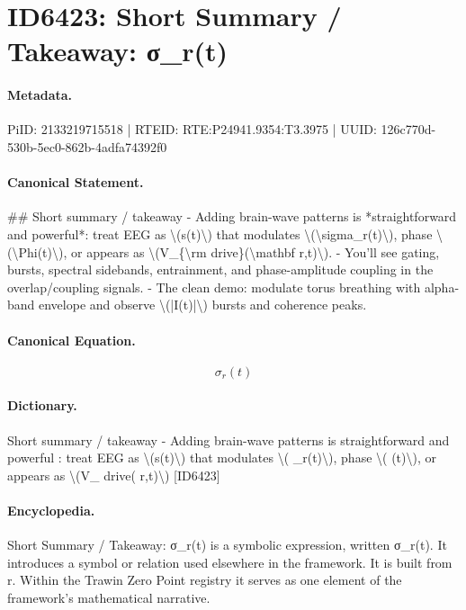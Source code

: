 \section*{ID6423: Short Summary / Takeaway: σ\_r(t)}
\paragraph{Metadata.}
PiID: 2133219715518 | RTEID: RTE:P24941.9354:T3.3975 | UUID: 126c770d-530b-5ec0-862b-4adfa74392f0

\paragraph{Canonical Statement.}
\#\# Short summary / takeaway - Adding brain-wave patterns is *straightforward and powerful*: treat EEG as \textbackslash{}(s(t)\textbackslash{}) that modulates \textbackslash{}(\textbackslash{}sigma\_r(t)\textbackslash{}), phase \textbackslash{}(\textbackslash{}Phi(t)\textbackslash{}), or appears as \textbackslash{}(V\_\{\textbackslash{}rm drive\}(\textbackslash{}mathbf r,t)\textbackslash{}). - You’ll see gating, bursts, spectral sidebands, entrainment, and phase-amplitude coupling in the overlap/coupling signals. - The clean demo: modulate torus breathing with alpha-band envelope and observe \textbackslash{}(|I(t)|\textbackslash{}) bursts and coherence peaks.

\paragraph{Canonical Equation.}
\[
\sigma_r(t)
\]

\paragraph{Dictionary.}
Short summary / takeaway - Adding brain-wave patterns is straightforward and powerful : treat EEG as \textbackslash{}(s(t)\textbackslash{}) that modulates \textbackslash{}( \_r(t)\textbackslash{}), phase \textbackslash{}( (t)\textbackslash{}), or appears as \textbackslash{}(V\_ drive( r,t)\textbackslash{}) [ID6423]

\paragraph{Encyclopedia.}
Short Summary / Takeaway: σ\_r(t) is a symbolic expression, written σ\_r(t). It introduces a symbol or relation used elsewhere in the framework. It is built from r. Within the Trawin Zero Point registry it serves as one element of the framework's mathematical narrative.
